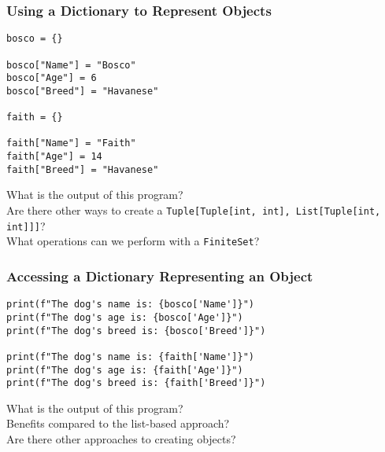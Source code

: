 \documentclass[14pt,aspectratio=169]{beamer}
\begin{document}
%
\begin{frame}[fragile]
  \frametitle{Using a Dictionary to Represent Objects}
  \begin{minipage}{6in}
    \vspace*{.2in}
    \begin{verbatim}
bosco = {}

bosco["Name"] = "Bosco"
bosco["Age"] = 6
bosco["Breed"] = "Havanese"

faith = {}

faith["Name"] = "Faith"
faith["Age"] = 14
faith["Breed"] = "Havanese"
    \end{verbatim}
  \end{minipage}
  \vspace*{.25in}
  \begin{center}
    \normalsize \noindent What is the output of this program? \\
    \normalsize \noindent Are there other ways to create a {\tt Tuple[Tuple[int, int], List[Tuple[int, int]]]}? \\
    \normalsize \noindent What operations can we perform with a {\tt FiniteSet}? \\
  \end{center}
\end{frame}

%
\begin{frame}[fragile]
  \frametitle{Accessing a Dictionary Representing an Object}
  \hspace*{-.1in}
  \begin{minipage}{6in}
    \vspace*{.2in}
    \begin{verbatim}
print(f"The dog's name is: {bosco['Name']}")
print(f"The dog's age is: {bosco['Age']}")
print(f"The dog's breed is: {bosco['Breed']}")

print(f"The dog's name is: {faith['Name']}")
print(f"The dog's age is: {faith['Age']}")
print(f"The dog's breed is: {faith['Breed']}")
    \end{verbatim}
  \end{minipage}
  \vspace*{.1in}
  \begin{center}
    \normalsize \noindent What is the output of this program? \\
    \normalsize \noindent Benefits compared to the list-based approach? \\
    \normalsize \noindent Are there other approaches to creating objects? \\
  \end{center}
\end{frame}
\end{document}
